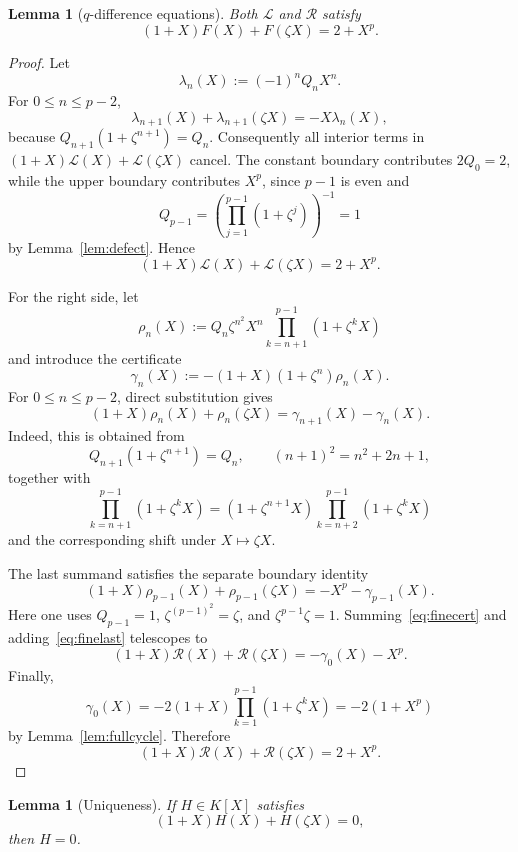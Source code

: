 \documentclass[11pt]{article}
\newtheorem{lemma}[theorem]{Lemma}
\theoremstyle{definition}
\begin{document}
\begin{lemma}[$q$-difference equations]\label{lem:fineqdiff}
Both $\mathcal L$ and $\mathcal R$ satisfy
\begin{equation}\label{eq:fineqdiff}
  (1+X)F(X)+F(\zeta X)=2+X^p.
\end{equation}
\end{lemma}

\begin{proof}
Let
\[
  \lambda_n(X):=(-1)^nQ_nX^n.
\]
For $0\le n\le p-2$,
\[
  \lambda_{n+1}(X)+\lambda_{n+1}(\zeta X)
  =-X\lambda_n(X),
\]
because $Q_{n+1}(1+\zeta^{n+1})=Q_n$. Consequently all interior terms in
$(1+X)\mathcal L(X)+\mathcal L(\zeta X)$ cancel. The constant boundary contributes $2Q_0=2$, while the upper boundary contributes $X^p$, since $p-1$ is even and
\[
  Q_{p-1}
  =\left(\prod_{j=1}^{p-1}(1+\zeta^j)\right)^{-1}
  =1
\]
by Lemma~\ref{lem:defect}. Hence
\[
  (1+X)\mathcal L(X)+\mathcal L(\zeta X)=2+X^p.
\]

For the right side, let
\[
  \rho_n(X):=
  Q_n\zeta^{n^2}X^n
  \prod_{k=n+1}^{p-1}(1+\zeta^kX)
\]
and introduce the certificate
\[
  \gamma_n(X):=
  -(1+X)(1+\zeta^n)\rho_n(X).
\]
For $0\le n\le p-2$, direct substitution gives
\begin{equation}\label{eq:finecert}
  (1+X)\rho_n(X)+\rho_n(\zeta X)
  =\gamma_{n+1}(X)-\gamma_n(X).
\end{equation}
Indeed, this is obtained from
\[
  Q_{n+1}(1+\zeta^{n+1})=Q_n,
  \qquad
  (n+1)^2=n^2+2n+1,
\]
together with
\[
  \prod_{k=n+1}^{p-1}(1+\zeta^kX)
  =(1+\zeta^{n+1}X)
   \prod_{k=n+2}^{p-1}(1+\zeta^kX)
\]
and the corresponding shift under $X\mapsto\zeta X$.

The last summand satisfies the separate boundary identity
\begin{equation}\label{eq:finelast}
  (1+X)\rho_{p-1}(X)+\rho_{p-1}(\zeta X)
  =-X^p-\gamma_{p-1}(X).
\end{equation}
Here one uses $Q_{p-1}=1$, $\zeta^{(p-1)^2}=\zeta$, and
$\zeta^{p-1}\zeta=1$. Summing~\eqref{eq:finecert} and adding~\eqref{eq:finelast} telescopes to
\[
  (1+X)\mathcal R(X)+\mathcal R(\zeta X)
  =-\gamma_0(X)-X^p.
\]
Finally,
\[
  \gamma_0(X)
  =-2(1+X)\prod_{k=1}^{p-1}(1+\zeta^kX)
  =-2(1+X^p)
\]
by Lemma~\ref{lem:fullcycle}. Therefore
\[
  (1+X)\mathcal R(X)+\mathcal R(\zeta X)
  =2+X^p.
\]
\end{proof}

\begin{lemma}[Uniqueness]\label{lem:fineunique}
If $H\in K[X]$ satisfies
\[
  (1+X)H(X)+H(\zeta X)=0,
\]
then $H=0$.
\end{lemma}
\end{document}
